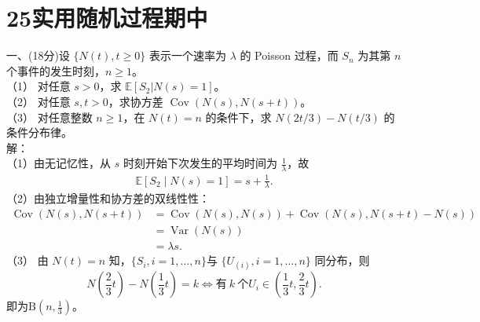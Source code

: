 \documentclass[UTF8,openany]{book}
\begin{document}
\section{\centering 25实用随机过程期中}
\noindent 一、(18分)设 $\{N(t), t \geq 0\}$ 表示一个速率为 $\lambda$ 的 Poisson 过程，而 $S_n$ 为其第 $n$ 个事件的发生时刻，$n \geq 1$。\\
（1） 对任意 $s > 0$，求 $\mathbb{E}[S_2|N(s) = 1]$。\\
（2） 对任意 $s, t > 0$，求协方差 $\operatorname{Cov}(N(s), N(s + t))$。\\
（3） 对任意整数 $n \geq 1$，在 $N(t) = n$ 的条件下，求 $N(2t/3) - N(t/3)$ 的条件分布律。\\
解：\\
\qquad （1）由无记忆性，从 $s$ 时刻开始下次发生的平均时间为 $\displaystyle \frac{1}{\lambda}$，故
\begin{align*}
	\mathbb{E}[S_2 \mid N(s)=1]= s+\frac{1}{\lambda}.
\end{align*}
（2）由独立增量性和协方差的双线性性：
\begin{align*}
	\operatorname{Cov}(N(s),N(s+t)) &= \operatorname{Cov}(N(s),N(s))+\operatorname{Cov}(N(s),N(s+t)-N(s))\\
	&= \operatorname{Var}(N(s))\\
	&= \lambda s.
\end{align*}
（3）
由 $N(t)=n$ 知，$\{S_i,i=1,\dots,n\}$与 $\{U_{(i)},i=1,\dots,n\}$ 同分布，则
$$N(\frac{2}{3}t)-N(\frac{1}{3}t)=k \iff \text{有}\ k\ \text{个}U_i\in(\frac{1}{3}t,\frac{2}{3}t).$$
即为$\displaystyle \mathrm{B}(n,\frac{1}{3})$。\\
\end{document}
